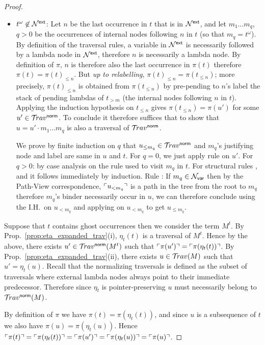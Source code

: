 \documentclass{article}
\theoremstyle{definition}
\newcommand\Nodes{\mathcal{N}}%
\newcommand\NodesVar{\Nodes_{\sf var}}%
\newcommand{\normalizing}{{\sf norm}}
\newcommand{\travsetnorm}{\travset^\normalizing}
\newcommand{\travulc}{\travset}
\def\coresymbol{\pi} %
\newcommand{\core}[1]{\coresymbol(#1)} %
\newcommand{\ExtNodes}{\Nodes^{\sf ext}}
\begin{document}
\begin{proof}
\begin{itemize}
\item $t^\omega\not\in \ExtNodes$: Let $n$ be the last occurrence in $t$ that is in $\ExtNodes$, and let $m_1 \ldots m_q$, $q>0$ be the occurrences of internal nodes following $n$ in $t$ (so that $m_q = t^\omega$). By definition of the traversal rules, a variable in $\ExtNodes$ is necessarily followed by a lambda node in $\ExtNodes$, therefore $n$ is necessarily a lambda node. By definition of $\coresymbol$, $n$ is therefore also the last occurrence in $\core{t}$ therefore $\core{t} = \core{t}_{\leq n}$.
But \emph{up to relabelling}, $\core{t}_{\leq n} = \core{t_{\leq n}}$; more precisely, $\core{t}_{\leq n}$ is obtained from $\core{t_{\leq n}}$
by pre-pending to $n$'s label the stack of pending lambdas of $t_{>m}$ (the internal nodes following $n$ in $t$). Applying the induction hypothesis on $t_{\leq n}$ gives $\core{t_{\leq n}} = \core{u'}$ for some $u' \in \travsetnorm$.
To conclude it therefore suffices that to show that $u = u' \cdot m_1 \ldots m_q$ is also a traversal of $\travsetnorm$.

We prove by finite induction on $q$ that $u_{\leq m_q} \in\travsetnorm$ and $m_q$'s justifying node and label are same in $u$ and $t$. For $q=0$, we just apply rule  on $u'$.
For $q>0$: by case analysis on the rule used to visit $m_q$ in $t$.
For structural rules ,  and  it follows immediately by induction.
Rule : If $m_q \in \NodesVar$ then by the Path-View correspondence, $\ulcorner u_{<m_q} \urcorner$ is a path in the tree from the root to $m_q$ therefore $m_q$'s binder necessarily occur in $u$, we can therefore conclude using the I.H.~on $u_{<m_q}$ and applying  on $u_{<m_q}$ to get $u_{\leq m_q}$.
\end{itemize}
Suppose that $t$ contains ghost occurrences then we consider the term $M^t$.
By Prop.~\ref{prop:eta_expanded_trav}(i), $\eta_t(t)$ is a traversal of $M^t$. Hence by the above, there exists $u'\in\travsetnorm(M^t)$ such that
$\pview{\core{u'}}=\pview{\core{\eta_t(t)}}$.
By Prop.~\ref{prop:eta_expanded_trav}(ii),
there exists $u \in \travulc(M)$ such that
$u' = \eta_t(u)$. Recall that the normalizing traversals is defined as the subset of traversals where external lambda nodes always point to their immediate predecessor. Therefore since $\eta_t$ is pointer-preserving $u$ must necessarily belong to $\travsetnorm(M)$.

By definition of $\coresymbol$ we have $\core{t} = \core{\eta_t(t)}$, and since $u$ is a subsequence of $t$ we also have $\core{u} = \core{\eta_t(u)}$.
Hence $\pview{\core{t}}=\pview{\core{\eta_t(t)}}=
\pview{\core{u'}} = \pview{\core{\eta_t(u)}} = \pview{\core{u}}$.
\end{proof}
\end{document}
